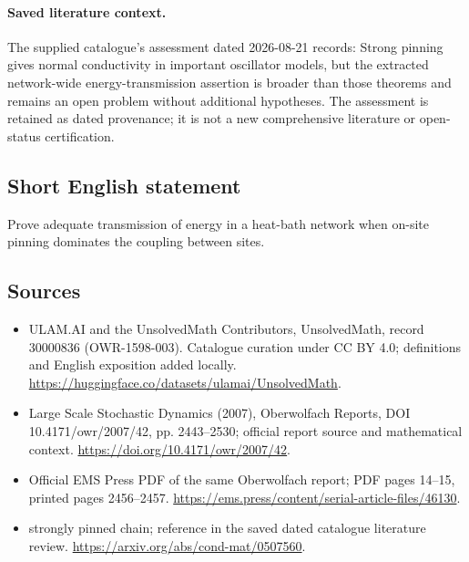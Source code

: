 \documentclass[11pt]{article}
\begin{document}
\paragraph{Saved literature context.} The supplied catalogue's assessment dated 2026-08-21 records: Strong pinning gives normal conductivity in important oscillator models, but the extracted network-wide energy-transmission assertion is broader than those theorems and remains an open problem without additional hypotheses. The assessment is retained as dated provenance; it is not a new comprehensive literature or open-status certification.
\subsection{Short English statement}
Prove adequate transmission of energy in a heat-bath network when on-site pinning dominates the coupling between sites.
\subsection{Sources}
\begin{itemize}
\item[\hypertarget{source:30000836:1}{S1}] ULAM.AI and the UnsolvedMath Contributors, UnsolvedMath, record 30000836 (OWR-1598-003). Catalogue curation under CC BY 4.0; definitions and English exposition added locally.
\url{https://huggingface.co/datasets/ulamai/UnsolvedMath}.
\item[\hypertarget{source:30000836:2}{S2}] Large Scale Stochastic Dynamics (2007), Oberwolfach Reports, DOI 10.4171/owr/2007/42, pp. 2443--2530; official report source and mathematical context.
\url{https://doi.org/10.4171/owr/2007/42}.
\item[\hypertarget{source:30000836:3}{S3}] Official EMS Press PDF of the same Oberwolfach report; PDF pages 14--15, printed pages 2456--2457.
\url{https://ems.press/content/serial-article-files/46130}.
\item[\hypertarget{source:30000836:4}{S4}] strongly pinned chain; reference in the saved dated catalogue literature review.
\url{https://arxiv.org/abs/cond-mat/0507560}.
\end{itemize}
\label{end:30000836}
\end{document}

